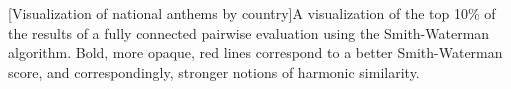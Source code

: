 [Visualization of national anthems by country]A visualization of the top 10\% of the results of a fully connected pairwise evaluation using the Smith-Waterman algorithm. Bold, more opaque, red lines correspond to a better Smith-Waterman score, and correspondingly, stronger notions of harmonic similarity.